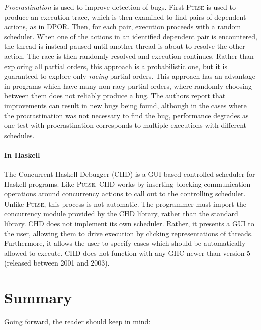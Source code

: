 \emph{Procrastination}\cite{sen2008} is used to improve detection of
bugs.  First \textsc{Pulse} is used to produce an execution trace,
which is then examined to find pairs of dependent actions, as in DPOR.
Then, for each pair, execution proceeds with a random scheduler.  When
one of the actions in an identified dependent pair is encountered, the
thread is instead paused until another thread is about to resolve the
other action.  The race is then randomly resolved and execution
continues.  Rather than exploring all partial orders, this approach is
a probabilistic one, but it is guaranteed to explore only
\emph{racing} partial orders.  This approach has an advantage in
programs which have many non-racy partial orders, where randomly
choosing between them does not reliably produce a bug.  The authors
report that improvements can result in new bugs being found, although
in the cases where the procrastination was not necessary to find the
bug, performance degrades\cite{arts2011} as one test with
procrastination corresponds to multiple executions with different
schedules.

\paragraph{In Haskell}
The Concurrent Haskell Debugger (CHD)\cite{bottcher2002} is a
GUI-based controlled scheduler for Haskell programs.  Like
\textsc{Pulse}, CHD works by inserting blocking communication
operations around concurrency actions to call out to the controlling
scheduler.  Unlike \textsc{Pulse}, this process is not automatic.  The
programmer must import the concurrency module provided by the CHD
library, rather than the standard library.  CHD does not implement its
own scheduler.  Rather, it presents a GUI to the user, allowing them
to drive execution by clicking representations of threads.
Furthermore, it allows the user to specify cases which should be
automatically allowed to execute.  CHD does not function with any GHC
newer than version 5 (released between 2001 and 2003).

\vfill\pagebreak
\section{Summary}

Going forward, the reader should keep in mind:

